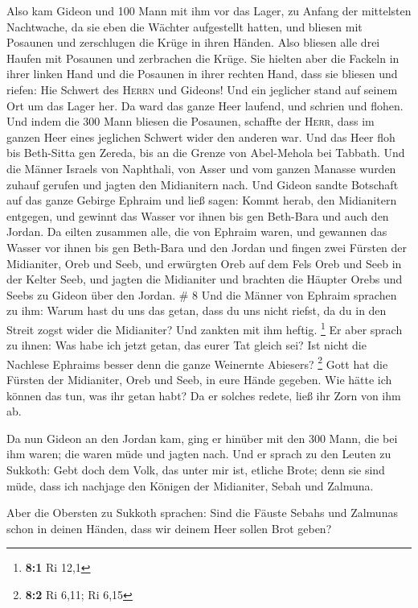  Also kam Gideon und 100 Mann mit ihm vor das Lager, zu
Anfang der mittelsten Nachtwache, da sie eben die Wächter aufgestellt
hatten, und bliesen mit Posaunen und zerschlugen die Krüge in ihren
Händen.  Also bliesen alle drei Haufen mit Posaunen und
zerbrachen die Krüge. Sie hielten aber die Fackeln in ihrer linken Hand
und die Posaunen in ihrer rechten Hand, dass sie bliesen und riefen: Hie
Schwert des \textsc{Herrn} und Gideons!  Und ein
jeglicher stand auf seinem Ort um das Lager her. Da ward das ganze Heer
laufend, und schrien und flohen.  Und indem die 300 Mann
bliesen die Posaunen, schaffte der \textsc{Herr}, dass im ganzen Heer
eines jeglichen Schwert wider den anderen war. Und das Heer floh bis
Beth-Sitta gen Zereda, bis an die Grenze von Abel-Mehola bei Tabbath.
 Und die Männer Israels von Naphthali, von Asser und vom
ganzen Manasse wurden zuhauf gerufen und jagten den Midianitern nach.
 Und Gideon sandte Botschaft auf das ganze Gebirge
Ephraim und ließ sagen: Kommt herab, den Midianitern entgegen, und
gewinnt das Wasser vor ihnen bis gen Beth-Bara und auch den Jordan. Da
eilten zusammen alle, die von Ephraim waren, und gewannen das Wasser vor
ihnen bis gen Beth-Bara und den Jordan  und fingen zwei
Fürsten der Midianiter, Oreb und Seeb, und erwürgten Oreb auf dem Fels
Oreb und Seeb in der Kelter Seeb, und jagten die Midianiter und brachten
die Häupter Orebs und Seebs zu Gideon über den Jordan. \# 8
 Und die Männer von Ephraim sprachen zu ihm: Warum hast du
uns das getan, dass du uns nicht riefst, da du in den Streit zogst wider
die Midianiter? Und zankten mit ihm heftig. \footnote{\textbf{8:1} Ri
  12,1}  Er aber sprach zu ihnen: Was habe ich jetzt
getan, das eurer Tat gleich sei? Ist nicht die Nachlese Ephraims besser
denn die ganze Weinernte Abiesers? \footnote{\textbf{8:2} Ri 6,11; Ri
  6,15}  Gott hat die Fürsten der Midianiter, Oreb und
Seeb, in eure Hände gegeben. Wie hätte ich können das tun, was ihr getan
habt? Da er solches redete, ließ ihr Zorn von ihm ab.

 Da nun Gideon an den Jordan kam, ging er hinüber mit den
300 Mann, die bei ihm waren; die waren müde und jagten nach.
 Und er sprach zu den Leuten zu Sukkoth: Gebt doch dem
Volk, das unter mir ist, etliche Brote; denn sie sind müde, dass ich
nachjage den Königen der Midianiter, Sebah und Zalmuna.

 Aber die Obersten zu Sukkoth sprachen: Sind die Fäuste
Sebahs und Zalmunas schon in deinen Händen, dass wir deinem Heer sollen
Brot geben?

